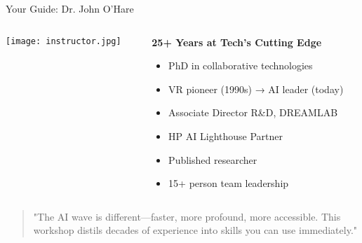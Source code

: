 \documentclass{beamer}
\begin{document}
\begin{frame}{Your Guide: Dr. John O'Hare}
\begin{columns}[T]
\begin{column}{0.4\textwidth}
\texttt{[image: instructor.jpg]}
\end{column}
\begin{column}{0.55\textwidth}
\textbf{25+ Years at Tech's Cutting Edge}
\begin{itemize}
\item PhD in collaborative technologies
\item VR pioneer (1990s) → AI leader (today)
\item Associate Director R\&D, DREAMLAB
\item HP AI Lighthouse Partner
\item Published researcher
\item 15+ person team leadership
\end{itemize}
\end{column}
\end{columns}
\vspace{0.5em}
\begin{quote}
\small{"The AI wave is different—faster, more profound, more accessible. This workshop distils decades of experience into skills you can use immediately."}
\end{quote}
\end{frame}
\end{document}
